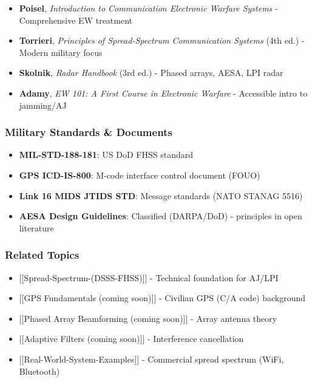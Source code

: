\begin{itemize}
\tightlist
\item
  \textbf{Poisel}, \emph{Introduction to Communication Electronic
  Warfare Systems} - Comprehensive EW treatment
\item
  \textbf{Torrieri}, \emph{Principles of Spread-Spectrum Communication
  Systems} (4th ed.) - Modern military focus
\item
  \textbf{Skolnik}, \emph{Radar Handbook} (3rd ed.) - Phased arrays,
  AESA, LPI radar
\item
  \textbf{Adamy}, \emph{EW 101: A First Course in Electronic Warfare} -
  Accessible intro to jamming/AJ
\end{itemize}

\subsubsection{Military Standards \&
Documents}\label{military-standards-documents}

\begin{itemize}
\tightlist
\item
  \textbf{MIL-STD-188-181}: US DoD FHSS standard
\item
  \textbf{GPS ICD-IS-800}: M-code interface control document (FOUO)
\item
  \textbf{Link 16 MIDS JTIDS STD}: Message standards (NATO STANAG 5516)
\item
  \textbf{AESA Design Guidelines}: Classified (DARPA/DoD) - principles
  in open literature
\end{itemize}

\subsubsection{Related Topics}\label{related-topics}

\begin{itemize}
\tightlist
\item
  {[}{[}Spread-Spectrum-(DSSS-FHSS){]}{]} - Technical foundation for
  AJ/LPI
\item
  {[}{[}GPS Fundamentals (coming soon){]}{]} - Civilian GPS (C/A code)
  background
\item
  {[}{[}Phased Array Beamforming (coming soon){]}{]} - Array antenna
  theory
\item
  {[}{[}Adaptive Filters (coming soon){]}{]} - Interference cancellation
\item
  {[}{[}Real-World-System-Examples{]}{]} - Commercial spread spectrum
  (WiFi, Bluetooth)
\end{itemize}

